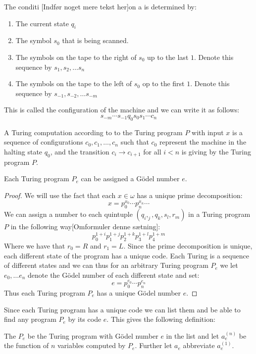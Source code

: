 \documentclass[../main.tex]{subfiles}
\begin{document}
The conditi [Indfør noget mere tekst her]on a is determined by:
\begin{enumerate}
	\item The current state $q_i$
	\item The symbol $s_0$ that is being scanned.
	\item The symbols on the tape to the right of $s_0$ up to the last $1$.
		Denote this sequence by $s_1,s_2,\ldots s_n$
	\item The symbols on the tape to the left of $s_0$ op to the first $1$.
		Denote this sequence by $s_{-1},s_{-2},\ldots s_{-m}$
\end{enumerate}
This is called the configuration of the machine and we can write it as follows:
$$s_{-m}\cdots s_{-1}q_0s_0s_1\cdots c_n$$

\begin{defi}
	A Turing computation according to to the Turing program $P$ with input
	$x$ is a sequence of configurations $c_0,c_1,\ldots, c_n$ such that
	$c_0$ represent the machine in the halting state $q_0$, and the
	transition $c_i\rightarrow c_{i+1}$ for all $i<n$ is giving by the
	Turing program $P$.
\end{defi}

\begin{prop}
	Each Turing program $P_e$ can be assigned a Gödel number $e$.
\end{prop}
\begin{proof}
	We will use the fact that each $x\in\omega$ has a unique
	prime decomposition:
	$$x=p_0^{x_0}\cdots p_n^{x_n}\cdots$$
	We can assign a number to each quintuple $(q_i,_j,q_k,s_l,r_m)$ in a
	Turing program $P$ in the following way[Omformuler denne sætning]:
	$$p_0^{1+i}p_1^{1+j}p_2^{1+k}p_3^{1+l}p_4^{1+m}$$
	Where we have that $r_0=R$ and $r_1=L$. Since the prime decomposition
	is unique, each different state of the program has a unique code. Each Turing
	is a sequence of different states and we can thus for an arbitrary
	Turing program $P_e$ we let $e_0,\ldots e_n$ denote the Gödel number of
	each different state and set:
	$$e=p_0^{e_0}\cdots p_n^{e_n}$$
	Thus each Turing program $P_e$ has a unique Gödel number $e$.
\end{proof}
Since each Turing program has a unique code we can list them and be able to
find any program $P_e$ by its code $e$. This gives the following definition:
\begin{defi}
	The $P_e$ be the Turing program with Gödel number $e$ in the list and
	let $a_e^{(n)}$ be the function of $n$ variables computed by $P_e$.
	Further let $a_e$ abbreviate $a_e^{(1)}$.
\end{defi}
\end{document}
